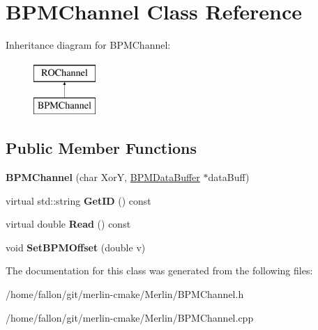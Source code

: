 \hypertarget{classBPMChannel}{}\section{B\+P\+M\+Channel Class Reference}
\label{classBPMChannel}
Inheritance diagram for B\+P\+M\+Channel\+:\begin{figure}[H]
\begin{center}
\leavevmode
\includegraphics[height=2.000000cm]{classBPMChannel}
\end{center}
\end{figure}
\subsection*{Public Member Functions}
\begin{DoxyCompactItemize}
\item 
\mbox{\label{classBPMChannel_aa12b2a5d9774cd741c45d79596bf9f4b}} 
{\bfseries B\+P\+M\+Channel} (char XorY, \hyperlink{classBPMDataBuffer}{B\+P\+M\+Data\+Buffer} $\ast$data\+Buff)
\item 
\mbox{\label{classBPMChannel_a460efd551918caf02c04914da18c6d57}} 
virtual std\+::string {\bfseries Get\+ID} () const
\item 
\mbox{\label{classBPMChannel_a31e679f16b475899d5f45a10363cb0a0}} 
virtual double {\bfseries Read} () const
\item 
\mbox{\label{classBPMChannel_aae9880f3570c3833bc5d43f75d5dc529}} 
void {\bfseries Set\+B\+P\+M\+Offset} (double v)
\end{DoxyCompactItemize}


The documentation for this class was generated from the following files\+:\begin{DoxyCompactItemize}
\item 
/home/fallon/git/merlin-\/cmake/\+Merlin/B\+P\+M\+Channel.\+h\item 
/home/fallon/git/merlin-\/cmake/\+Merlin/B\+P\+M\+Channel.\+cpp\end{DoxyCompactItemize}
